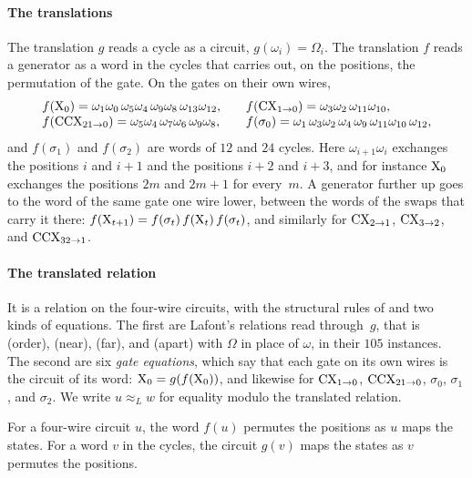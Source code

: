 \documentclass[acmsmall,screen,nonacm]{acmart}
\begin{document}
\paragraph{The translations} The translation $g$ reads a cycle as a circuit, $g(\omega_i)=\Omega_i$. The translation $f$ reads a generator as a word in the cycles that carries out, on the positions, the permutation of the gate. On the gates on their own wires,
\[
\begin{array}{@{}l@{\qquad}l@{}}
f(\X_0)=\omega_1\omega_0\,\omega_5\omega_4\,\omega_9\omega_8\,\omega_{13}\omega_{12}, & f(\CX_{1\to0})=\omega_3\omega_2\,\omega_{11}\omega_{10},\\
f(\CCX_{21\to0})=\omega_5\omega_4\,\omega_7\omega_6\,\omega_9\omega_8, & f(\sigma_0)=\omega_1\,\omega_3\omega_2\,\omega_4\,\omega_9\,\omega_{11}\omega_{10}\,\omega_{12},
\end{array}
\]
and $f(\sigma_1)$ and $f(\sigma_2)$ are words of $12$ and $24$ cycles. Here $\omega_{i+1}\omega_i$ exchanges the positions $i$ and $i+1$ and the positions $i+2$ and $i+3$, and for instance $\mathrm{X}_0$ exchanges the positions $2m$ and $2m+1$ for every~$m$. A generator further up goes to the word of the same gate one wire lower, between the words of the swaps that carry it there: $f(\mathrm{X}_{t+1})=f(\sigma_t)\,f(\mathrm{X}_t)\,f(\sigma_t)$, and similarly for $\mathrm{CX}_{2\to1}$, $\mathrm{CX}_{3\to2}$, and $\mathrm{CCX}_{32\to1}$.

\paragraph{The translated relation} It is a relation on the four-wire circuits, with the structural rules of  and two kinds of equations. The first are Lafont's relations read through~$g$, that is (order), (near), (far), and (apart) with $\Omega$ in place of $\omega$, in their $105$ instances. The second are six \emph{gate equations}, which say that each gate on its own wires is the circuit of its word: $\mathrm{X}_0=g(f(\mathrm{X}_0))$, and likewise for $\mathrm{CX}_{1\to0}$, $\mathrm{CCX}_{21\to0}$, $\sigma_0$, $\sigma_1$, and $\sigma_2$. We write $u\approx_L w$ for equality modulo the translated relation.

\begin{lemma}\label{lem:x-bridge}
For a four-wire circuit $u$, the word $f(u)$ permutes the positions as $u$ maps the states. For a word $v$ in the cycles, the circuit $g(v)$ maps the states as $v$ permutes the positions.
\end{lemma}
\end{document}

